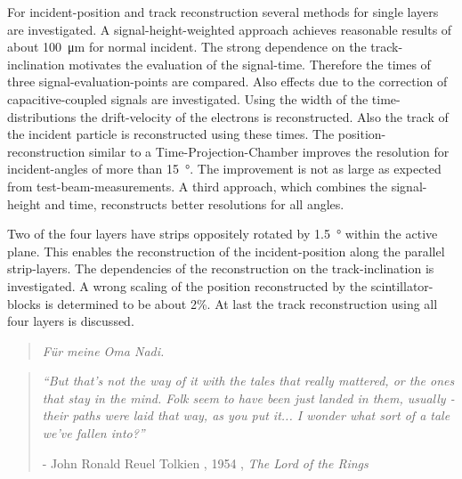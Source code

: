 \documentclass[
twoside,            %
BCOR1.4cm,          %
10pt,               %
headings=normal,    %
headsepline,        %
clearplainpage,		%
final,              %
div=14,
open=right,
bibliography=toc
]{scrreprt}
\begin{document}
For incident-position and track reconstruction several methods for single layers are investigated.
A signal-height-weighted approach achieves reasonable results of about \SI{100}{\micro\m} for normal incident.
The strong dependence on the track-inclination motivates the evaluation of the signal-time.
Therefore the times of three signal-evaluation-points are compared.
Also effects due to the correction of capacitive-coupled signals are investigated.
Using the width of the time-distributions the drift-velocity of the electrons is reconstructed.
Also the track of the incident particle is reconstructed using these times.
The position-reconstruction similar to a Time-Projection-Chamber improves the resolution for incident-angles of more than \SI{15}{\degree}.
The improvement is not as large as expected from test-beam-measurements.
A third approach, which combines the signal-height and time, reconstructs better resolutions for all angles.

Two of the four layers have strips oppositely rotated by \SI{1.5}{\degree} within the active plane.
This enables the reconstruction of the incident-position along the parallel strip-layers.
The dependencies of the reconstruction on the track-inclination is investigated.
A wrong scaling of the position reconstructed by the scintillator-blocks is determined to be about 2\%.
At last the track reconstruction using all four layers is discussed.

\newpage

\vspace*{\fill} 
\begin{quote} 
	\centering 
	\textit{
		F\"ur meine Oma Nadi.
	}
\end{quote}
\vspace*{\fill}

\tableofcontents

\vspace*{\fill} 
\begin{quote} 
	\textit{
		``But that's not the way of it with the tales that really mattered, or the ones that stay in the mind. Folk seem to have been just landed in them, usually - their paths were laid that way, as you put it... I wonder what sort of a tale we've fallen into?''
	}
	
	\hfill - John Ronald Reuel Tolkien , 1954 , \textit{The Lord of the Rings}
\end{quote}
\vspace*{\fill}

\end{document}
